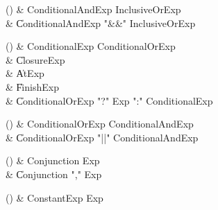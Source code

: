 \begin{bbgrammarappendix}

() & ConditionalAndExp \label{prod:ConditionalAndExp}  \: InclusiveOrExp  \\

 &    \| ConditionalAndExp \xcd"&&" InclusiveOrExp \\

\end{bbgrammarappendix}

\begin{bbgrammarappendix}

() & ConditionalExp \label{prod:ConditionalExp}  \: ConditionalOrExp  \\

 &    \| ClosureExp \\
 &    \| AtExp \\
 &    \| FinishExp \\
 &    \| ConditionalOrExp \xcd"?" Exp \xcd":" ConditionalExp \\

\end{bbgrammarappendix}

\begin{bbgrammarappendix}

() & ConditionalOrExp \label{prod:ConditionalOrExp}  \: ConditionalAndExp  \\

 &    \| ConditionalOrExp \xcd"||" ConditionalAndExp \\

\end{bbgrammarappendix}

\begin{bbgrammarappendix}

() & Conjunction \label{prod:Conjunction}  \: Exp  \\

 &    \| Conjunction \xcd"," Exp \\

\end{bbgrammarappendix}

\begin{bbgrammarappendix}

() & ConstantExp \label{prod:ConstantExp}  \: Exp  \\


\end{bbgrammarappendix}

